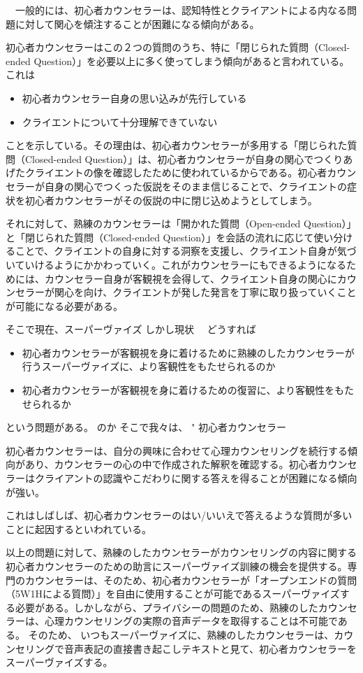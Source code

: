 \documentclass[shuuron]{kuee}
\begin{document}
　一般的には、初心者カウンセラーは、認知特性とクライアントによる内なる問題に対して関心を傾注することが困難になる傾向がある。

初心者カウンセラーはこの２つの質問のうち、特に「閉じられた質問（Closed-ended Question）」を必要以上に多く使ってしまう傾向があると言われている。これは

\begin{itemize}
\item 初心者カウンセラー自身の思い込みが先行している
\item クライエントについて十分理解できていない
\end{itemize}
ことを示している。その理由は、初心者カウンセラーが多用する「閉じられた質問（Closed-ended Question）」は、初心者カウンセラーが自身の関心でつくりあげたクライエントの像を確認したために使われているからである。初心者カウンセラーが自身の関心でつくった仮説をそのまま信じることで、クライエントの症状を初心者カウンセラーがその仮説の中に閉じ込めようとしてしまう。

それに対して、熟練のカウンセラーは「開かれた質問（Open-ended Question）」と「閉じられた質問（Closed-ended Question）」を会話の流れに応じて使い分けることで、クライエントの自身に対する洞察を支援し、クライエント自身が気づいていけるようにかかわっていく。これがカウンセラーにもできるようになるためには、カウンセラー自身が客観視を会得して、クライエント自身の関心にカウンセラーが関心を向け、クライエントが発した発言を丁寧に取り扱っていくことが可能になる必要がある。

そこで現在、スーパーヴァイズ
しかし現状　
どうすれば
\begin{itemize}
\item 初心者カウンセラーが客観視を身に着けるために熟練のしたカウンセラーが行うスーパーヴァイズに、より客観性をもたせられるのか
\item 初心者カウンセラーが客観視を身に着けるための復習に、より客観性をもたせられるか
\end{itemize}
という問題がある。
のか
そこで我々は、
"	初心者カウンセラー


  初心者カウンセラーは、自分の興味に合わせて心理カウンセリングを続行する傾向があり、カウンセラーの心の中で作成された解釈を確認する。初心者カウンセラーはクライアントの認識やこだわりに関する答えを得ることが困難になる傾向が強い。

これはしばしば、初心者カウンセラーのはい/いいえで答えるような質問が多いことに起因するといわれている。

 以上の問題に対して、熟練のしたカウンセラーがカウンセリングの内容に関する初心者カウンセラーのための助言にスーパーヴァイズ訓練の機会を提供する。専門のカウンセラーは、そのため、初心者カウンセラーが「オープンエンドの質問（5W1Hによる質問）」を自由に使用することが可能であるスーパーヴァイズする必要がある。しかしながら、プライバシーの問題のため、熟練のしたカウンセラーは、心理カウンセリングの実際の音声データを取得することは不可能である。 そのため、 いつもスーパーヴァイズに、熟練のしたカウンセラーは、カウンセリングで音声表記の直接書き起こしテキストと見て、初心者カウンセラーをスーパーヴァイズする。
\end{document}
